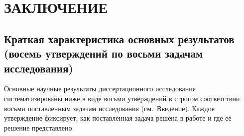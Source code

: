 
\chapter*{ЗАКЛЮЧЕНИЕ}

\section*{Краткая характеристика основных результатов
(восемь утверждений по восьми задачам исследования)}

Основные научные результаты диссертационного исследования
систематизированы ниже в виде восьми утверждений в строгом
соответствии восьми поставленным задачам исследования
(см.~Введение). Каждое утверждение фиксирует, как поставленная
задача решена в работе и где её решение представлено.

